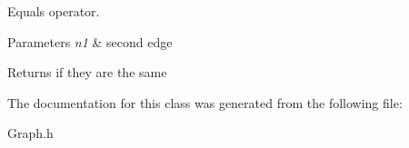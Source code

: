 Equals operator. 


\begin{DoxyParams}{Parameters}
{\em n1} & second edge \\
\hline
\end{DoxyParams}
\begin{DoxyReturn}{Returns}
if they are the same 
\end{DoxyReturn}


The documentation for this class was generated from the following file\+:\begin{DoxyCompactItemize}
\item 
Graph.\+h\end{DoxyCompactItemize}
